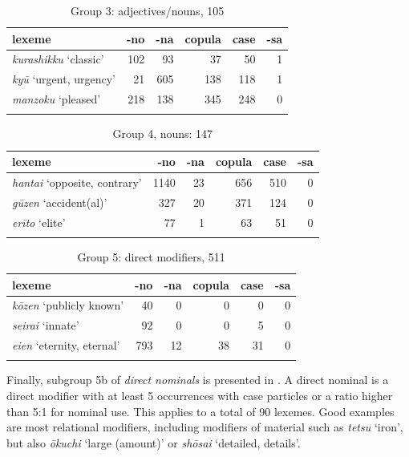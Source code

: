 \begin{table}[p!]
\centering
\begin{tabularx}{\textwidth}{Xrrrrr}
\lsptoprule
\textbf{lexeme} & \textbf{-no} & \textbf{-na} & \textbf{copula} & \textbf{case} & \textbf{-sa} \\
\midrule
\textit{kurashikku} `classic’        & 102 & 93  & 37  & 50  & 1 \\
\textit{kyū} `urgent, urgency’       & 21  & 605 & 138 & 118 & 1 \\
\textit{manzoku} `pleased’           & 218 & 138 & 345 & 248 & 0 \\
\lspbottomrule
\end{tabularx}
\caption{Group 3: adjectives/nouns, 105}
\label{table group 3}
\end{table}

\begin{table}[p!]
\centering
\begin{tabularx}{\textwidth}{Xrrrrr}
\lsptoprule
\textbf{lexeme} & \textbf{-no} & \textbf{-na} & \textbf{copula} & \textbf{case} & \textbf{-sa} \\
\midrule
\textit{hantai} `opposite, contrary’ & 1140 & 23 & 656 & 510 & 0 \\
\textit{gūzen} `accident(al)’       & 327  & 20 & 371 & 124 & 0 \\
\textit{erīto} `elite’               & 77   & 1  & 63  & 51  & 0 \\
\lspbottomrule
\end{tabularx}
\caption{Group 4, nouns: 147}
\label{table group 4}
\end{table}

\begin{table}[p!]
\centering
\begin{tabularx}{\textwidth}{Xrrrrr}
\lsptoprule
\textbf{lexeme} & \textbf{-no} & \textbf{-na} & \textbf{copula} & \textbf{case} & \textbf{-sa} \\
\midrule
\textit{kōzen} `publicly known’   & 40  & 0  & 0  & 0  & 0 \\
\textit{seirai} `innate’          & 92  & 0  & 0  & 5  & 0 \\
\textit{eien} `eternity, eternal’ & 793 & 12 & 38 & 31 & 0 \\
\lspbottomrule
\end{tabularx}
\caption{Group 5: direct modifiers, 511}
\label{table group 5}
\end{table}
\clearpage

Finally, subgroup 5b of \textit{direct nominals} is presented in . A direct nominal is a direct modifier with at least 5 occurrences with case particles or a ratio higher than 5:1 for nominal use. This applies to a total of 90 lexemes. Good examples are most relational modifiers, including modifiers of material such as \textit{tetsu} `iron’, but also \textit{ōkuchi} `large (amount)’ or \textit{shōsai} `detailed, details’. 


